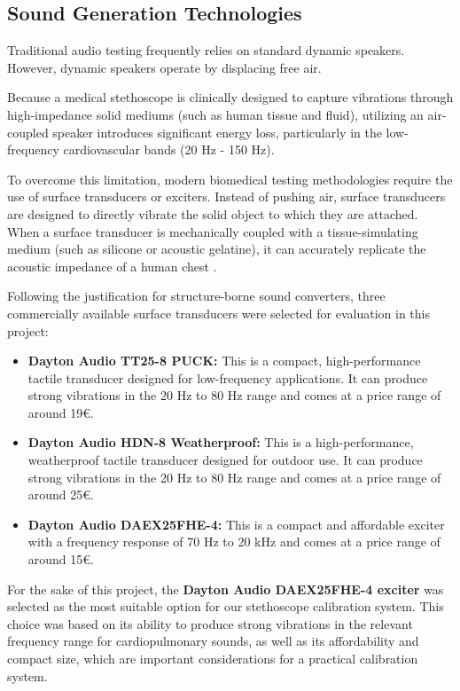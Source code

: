 \subsection{Sound Generation Technologies}
\label{sec:Ch3.1.1}

Traditional audio testing frequently relies on standard dynamic speakers. However, dynamic speakers operate by displacing free air.

Because a medical stethoscope is clinically designed to capture vibrations through high-impedance solid mediums (such as human tissue and fluid), utilizing an air-coupled speaker introduces significant energy loss, particularly in the low-frequency cardiovascular bands (20 Hz - 150 Hz).

To overcome this limitation, modern biomedical testing methodologies require the use of surface transducers or exciters. Instead of pushing air, surface transducers are designed to directly vibrate the solid object to which they are attached. When a surface transducer is mechanically coupled with a tissue-simulating medium (such as silicone or acoustic gelatine), it can accurately replicate the acoustic impedance of a human chest \cite{klum2019validation}.

Following the justification for structure-borne sound converters, three commercially available surface transducers were selected for evaluation in this project:
\begin{itemize}
    \item \textbf{Dayton Audio TT25-8 PUCK:} This is a compact, high-performance tactile transducer designed for low-frequency applications. It can produce strong vibrations in the 20 Hz to 80 Hz range and comes at a price range of around 19€. 
    \item \textbf{Dayton Audio HDN-8 Weatherproof:} This is a high-performance, weatherproof tactile transducer designed for outdoor use. It can produce strong vibrations in the 20 Hz to 80 Hz range and comes at a price range of around 25€.
    \item \textbf{Dayton Audio DAEX25FHE-4:} This is a compact and affordable exciter with a frequency response of 70 Hz to 20 kHz and comes at a price range of around 15€.
\end{itemize}

For the sake of this project, the \textbf{Dayton Audio DAEX25FHE-4 exciter} was selected as the most suitable option for our stethoscope calibration system. This choice was based on its ability to produce strong vibrations in the relevant frequency range for cardiopulmonary sounds, as well as its affordability and compact size, which are important considerations for a practical calibration system.


